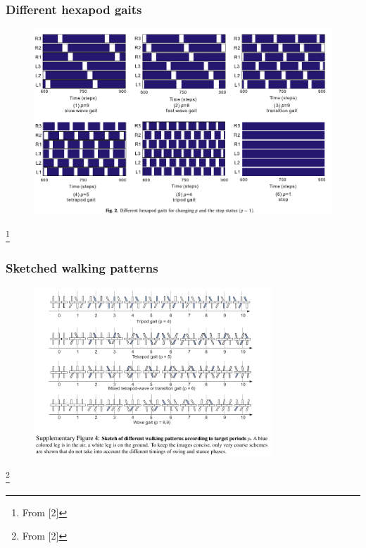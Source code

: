 \documentclass{beamer}
\begin{document}
\begin{frame}
\frametitle{Different hexapod gaits}
\begin{figure}
\center
\includegraphics[width=1\textwidth]{figs/different-hexapod-gaits.pdf}
\end{figure}
\footnote{From [2]}
\end{frame}

\begin{frame}
\frametitle{Sketched walking patterns}
\begin{figure}
\center
\includegraphics[width=0.8\textwidth]{figs/walking-pattern-sketch.pdf}
\end{figure}
\footnote{From [2]}
\end{frame}
\end{document}
